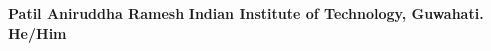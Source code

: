 \documentclass{article}
\begin{document}
\textbf{Patil Aniruddha Ramesh}
\textbf{Indian Institute of Technology, Guwahati.}
\textbf{He/Him}
\end{document}
